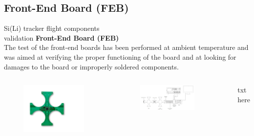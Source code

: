 \documentclass[aspectratio=169,xcolor=dvipsnames]{beamer}
\begin{document}
\subsection{Front-End Board (FEB)}
\begin{frame}{\vspace{-0.3cm}Si(Li) tracker flight components \\ validation}
    \fontsize{9pt}{1}\selectfont
    \vskip0.15cm
    \textbf{\large Front-End Board (FEB)} \\
    \vspace{0.15cm}
    The test of the front-end boards has been performed at ambient temperature and was aimed at verifying the proper functioning of the board and at looking for damages to the board or improperly soldered components.

    \vskip0.3cm
    \begin{columns}
            \begin{figure}
                \centering
                \includegraphics[width=0.9\textwidth]{images/flight_components_validation/FEB_immagine.pdf}
            \end{figure}
        
            \begin{figure}
                \centering
                \includegraphics[width=0.8\textwidth]{images/flight_components_validation/test_setup_FEB_2.jpg}
            \end{figure}
            txt here
    \end{columns}
\end{frame}
\end{document}
